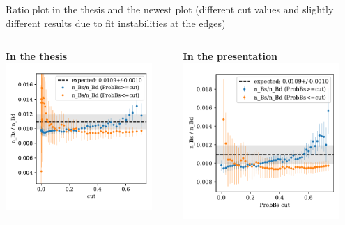 \documentclass[aspectratio=1610, 10pt]{beamer}
\begin{document}
\begin{frame}{Ratio plot in the thesis and the newest plot (different cut values and slightly different results due to fit instabilities at the edges)}
  \begin{columns}
    \begin{column}{0.5\textwidth}
      \centering
      \textbf{In the thesis}
      \includegraphics[width=0.9\textwidth]{images/data_ratio.pdf}
    \end{column}
    \begin{column}{0.5\textwidth}
      \centering
      \textbf{In the presentation}
      \includegraphics[width=0.9\textwidth]{images/ratio_data.pdf}
    \end{column}
  \end{columns}
\end{frame}
\end{document}
